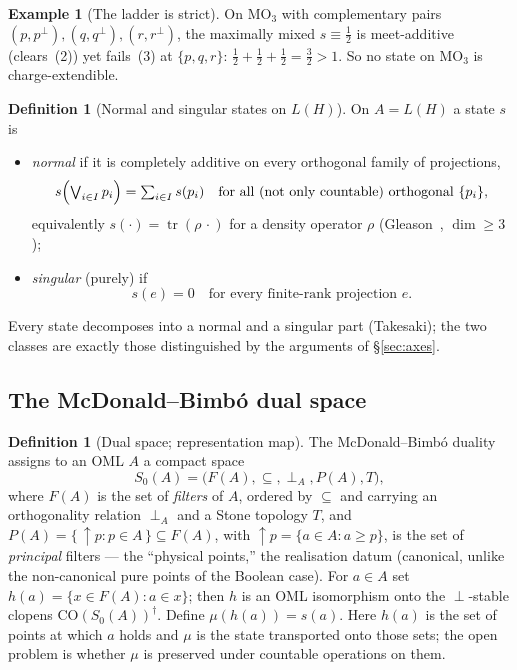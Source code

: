 \documentclass[11pt,reqno]{amsart}
\theoremstyle{plain}
\theoremstyle{definition}
\newtheorem{definition}[theorem]{Definition}
\newtheorem{example}[theorem]{Example}
\theoremstyle{remark}
\newcommand{\CO}{\mathrm{CO}}
\newcommand{\tr}{\operatorname{tr}}
\begin{document}
\begin{example}[The ladder is strict]\label{ex:strict}
On $\mathrm{MO}_3$ with complementary pairs $(p,p^\perp),(q,q^\perp),
(r,r^\perp)$, the maximally mixed $s \equiv \tfrac12$ is meet-additive
(clears~(2)) yet fails~(3) at $\{p,q,r\}$:
$\tfrac12+\tfrac12+\tfrac12 = \tfrac32 > 1$. So no state on
$\mathrm{MO}_3$ is charge-extendible.
\end{example}

\begin{definition}[Normal and singular states on $L(H)$]\label{def:normalsing}
On $A = L(H)$ a state $s$ is
\begin{itemize}[noitemsep, topsep=2pt]
  \item \emph{normal} if it is completely additive on every orthogonal family
    of projections,
    \[
      s\Bigl(\textstyle\bigvee_{i\in I} p_i\Bigr)=\sum_{i\in I} s(p_i)
      \quad\text{for all (not only countable) orthogonal } \{p_i\},
    \]
    equivalently $s(\cdot)=\tr(\rho\,\cdot)$ for a density operator $\rho$
    (Gleason~\cite{Gleason1957}, $\dim\!\geq\!3$);
  \item \emph{singular} (purely) if
    \[
      s(e)=0 \quad\text{for every finite-rank projection } e.
    \]
\end{itemize}
Every state decomposes into a normal and a singular part (Takesaki); the two
classes are exactly those distinguished by the arguments of \S\ref{sec:axes}.
\end{definition}

\subsection{The McDonald--Bimb\'{o} dual space}
\label{sec:dual}

\begin{definition}[Dual space; representation map]\label{def:dual}
The McDonald--Bimb\'{o} duality~\cite{McDonaldBimbo2023} assigns to an OML
$A$ a compact space
\[
  S_0(A) = \bigl(F(A), \subseteq, \perp_A, P(A), T\bigr),
\]
where $F(A)$ is the set of \emph{filters} of $A$, ordered by $\subseteq$
and carrying an orthogonality relation $\perp_A$ and a Stone topology $T$,
and $P(A) = \{\,{\uparrow}p : p\in A\,\} \subseteq F(A)$, with
${\uparrow}p=\{a\in A : a\geq p\}$, is the set of \emph{principal} filters ---
the ``physical points,'' the realisation datum (canonical, unlike the
non-canonical pure points of the Boolean case). For $a \in A$ set
$h(a) = \{x \in F(A) : a \in x\}$; then $h$ is an OML isomorphism onto the
$\perp$-stable clopens $\CO(S_0(A))^\dagger$. Define $\mu(h(a)) = s(a)$.
Here $h(a)$ is the set of points at which $a$ holds and $\mu$ is the state
transported onto those sets; the open problem is whether $\mu$ is preserved
under countable operations on them.
\end{definition}
\end{document}
